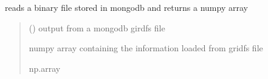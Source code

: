 \documentclass[letterpaper,10pt,english]{sphinxmanual}
\begin{document}
\begin{fulllineitems}
\label{\detokenize{forensicfit.utils.array_tools:forensicfit.utils.array_tools.read_bytes_io}}
\pysigstartsignatures
{}
\pysigstopsignatures
\sphinxAtStartPar
reads a binary file stored in mongodb and returns a numpy array
\begin{quote}\begin{description}
\sphinxAtStartPar
{}

\sphinxAtStartPar
{} () \textendash{} output from a mongodb girdfs file

\sphinxAtStartPar
numpy array containing the information loaded from gridfs file

\sphinxAtStartPar
np.array

\end{description}\end{quote}

\end{fulllineitems}


\begin{fulllineitems}
\label{\detokenize{forensicfit.utils.array_tools:forensicfit.utils.array_tools.write_bytes_io}}
\pysigstartsignatures
{}
\pysigstopsignatures\begin{quote}\begin{description}
\sphinxAtStartPar
{}

\end{description}\end{quote}

\end{fulllineitems}
\end{document}
